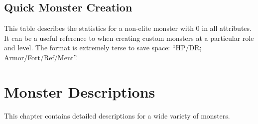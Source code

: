 \section{Quick Monster Creation}

    This table describes the statistics for a non-elite monster with 0 in all attributes.
    It can be a useful reference to when creating custom monsters at a particular role and level.
    The format is extremely terse to save space: ``HP/DR; Armor/Fort/Ref/Ment''.

    

\chapter{Monster Descriptions}

This chapter contains detailed descriptions for a wide variety of monsters.


